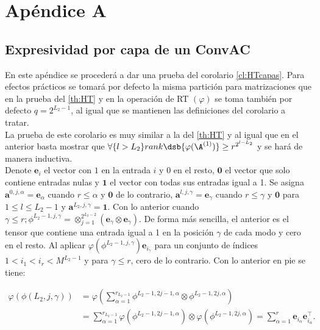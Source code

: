 \chapter{Apéndice A} \label{ap:htdecomp}


\section{Expresividad por capa de un ConvAC}

En este apéndice se procederá a dar una prueba del corolario \autoref{cl:HTcapas}. Para efectos prácticos se tomará por defecto la misma partición para matrizaciones que en la prueba del \autoref{th:HT} y en la operación de RT $(\varphi) $ se toma también por defecto $ q= 2^{L_2-1} $, al igual que se mantienen las definiciones del corolario a tratar.\\

La prueba de este corolario es muy similar a la del \autoref{th:HT} y al igual que en el anterior basta mostrar que $\forall\{l>L_2\} rank\dsb{\varphi(\A^{(1)})} \geq r^{2^{l-L_2}} $ y se hará de manera inductiva.\\

Denote $\textbf{e}_i$ el vector con $1$ en la entrada $i$ y $0$ en el resto, $\textbf{0}$ el vector que solo contiene entradas nulas y $\textbf{1}$ el vector con todas sus entradas igual a 1. Se asigna  $\textbf{a}^{0,j,\alpha} = \textbf{e}_\alpha$ cuando $r\leq\alpha$ y $\textbf{0}$ de lo contrario, $\textbf{a}^{l,j,\gamma} = \textbf{e}_\gamma$ cuando $r\leq\gamma$ y $\textbf{0}$ para $1\leq l \leq L_2-1 $ y $\textbf{a}^{L_2,j,\gamma} = \textbf{1}$. Con lo anterior cuando $ \gamma\leq r; \phi^{L_2-1,j,\gamma}  = \otimes_{j=1}^{2^{L_{2}-2}}(\textbf{e}_\gamma \otimes \textbf{e}_\gamma ) $. De forma más sencilla, el anterior es el tensor que contiene una entrada igual a 1 en la posición $ \gamma  $ de cada modo y cero en el resto. Al aplicar $\varphi(\phi^{L_2-1,j,\gamma})\textbf{e}_{i_\gamma}$ para un conjunto de índices $ 1< i_1 < i_r < M^{L_2-1} $ y para $ \gamma \leq r $, cero de lo contrario. Con lo anterior en pie se tiene:

\begin{equation}
\begin{split}
	\varphi(\phi(L_2,j, \gamma)) &= \varphi\left(
	\sum_{\alpha = 1}^{r_{L_2-1}} \phi^{L_2-1,2j-1,\alpha} \otimes \phi^{L_2-1,2j,\alpha} \right)\\
	&=
	\sum_{\alpha = 1}^{r_{L_2-1}}
	\varphi(\phi^{L_2-1,2j-1,\alpha}) \otimes \varphi(\phi^{L_2-1,2j,\alpha}) = 
	\sum_{\alpha = 1}^{r} \textbf{e}_{i_\alpha} \textbf{e}_{i_\alpha}^\top.
\end{split}
\end{equation}

